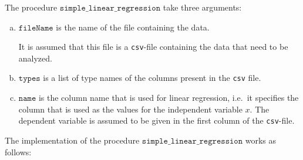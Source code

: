 The procedure $\mathtt{simple\_linear\_regression}$ take three arguments:
\begin{enumerate}[(a)]
\item $\mathtt{fileName}$ is the name of the file containing the data.

      It is assumed that this file is a \texttt{csv}-file containing the data that need to be analyzed.
\item $\mathtt{types}$ is a list of type names of the columns present in the \texttt{csv} file.
\item $\mathtt{name}$ is the column name that is used for linear regression, i.e.~it specifies the column that 
      is used as the values for the independent variable $x$.  The dependent variable is assumed to be given in
      the first column of the \texttt{csv}-file.
\end{enumerate}
The implementation of the procedure $\mathtt{simple\_linear\_regression}$ works as follows:
